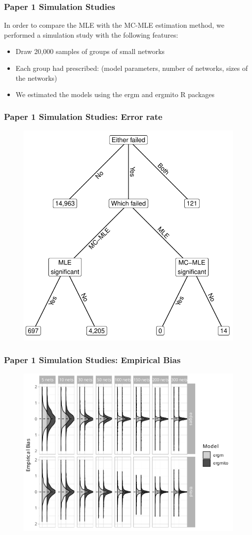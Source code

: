\documentclass[aspectratio=169, 10pt]{beamer}
\begin{document}
\begin{frame}
\frametitle{Paper 1 Simulation Studies}

In order to compare the MLE with the MC-MLE estimation method, we performed a simulation study with the following features:

\begin{itemize}
\item Draw 20,000 samples of groups of small networks
\item Each group had prescribed: (model parameters, number of networks, sizes of the networks)
\item We estimated the models using the ergm and ergmito R packages
\end{itemize}

\end{frame}

\begin{frame}
\frametitle{Paper 1 Simulation Studies: Error rate}

\begin{figure}
\centering
\includegraphics[width=.4\linewidth]{failed-tree.pdf}
\end{figure}

\end{frame}

\begin{frame}
\frametitle{Paper 1 Simulation Studies: Empirical Bias}

\begin{figure}
\centering
\includegraphics[width=.6\linewidth]{bias-02-various-sizes-4-5-ttriad.pdf}
\end{figure}

\end{frame}
\end{document}
